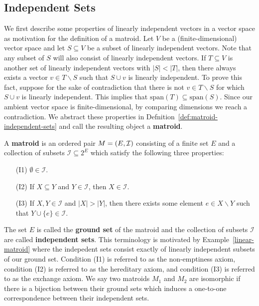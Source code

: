 \documentclass{puthesis-UG}
\begin{document}
\subsection{Independent Sets} \label{sec:independent-sets}

We first describe some properties of linearly independent vectors in a vector space as motivation for the definition of a matroid. Let $V$ be a (finite-dimensional) vector space and let $S \subseteq V$ be a subset of linearly independent vectors. Note that any subset of $S$ will also consist of linearly independent vectors. If $T \subseteq V$ is another set of linearly independent vectors with $|S| < |T|$, then there always exists a vector $v \in T \backslash S$ such that $S \cup v$ is linearly independent. To prove this fact, suppose for the sake of contradiction that there is not $v \in T \backslash S$ for which $S \cup v$ is linearly independent. This implies that $\text{span} (T) \subseteq \text{span} (S)$. Since our ambient vector space is finite-dimensional, by comparing dimensions we reach a contradiction. We abstract these properties in Defnition~\ref{def:matroid-independent-sets} and call the resulting object a \textbf{matroid}. 

\begin{defn} \label{def:matroid-independent-sets}
	A \textbf{matroid} is an ordered pair $M = (E, \mathcal{I})$ consisting of a finite set $E$ and a collection of subsets $\mathcal{I} \subseteq 2^E$ which satisfy the following three properties:
	\begin{enumerate}
		\item[(I1)] $\emptyset \in \mathcal{I}$.
		\item[(I2)] If $X \subseteq Y$ and $Y \in \mathcal{I}$, then $X \in \mathcal{I}$.
		\item[(I3)] If $X, Y \in \mathcal{I}$ and $|X| > |Y|$, then there exists some element $e \in X \backslash Y$ such that $Y \cup \{e\} \in \mathcal{I}$.
	\end{enumerate}
\end{defn}

The set $E$ is called the \textbf{ground set} of the matroid and the collection of subsets $\mathcal{I}$ are called \textbf{independent sets}. This terminology is motivated by Example~\ref{linear-matroid} where the indepedent sets consist exactly of linearly independent subsets of our ground set. Condition (I1) is referred to as the non-emptiness axiom, condition (I2) is referred to as the hereditary axiom, and condition (I3) is referred to as the exchange axiom. We say two matroids $M_1$ and $M_2$ are isomorphic if there is a bijection between their ground sets which induces a one-to-one correspondence between their independent sets. 
\end{document}

